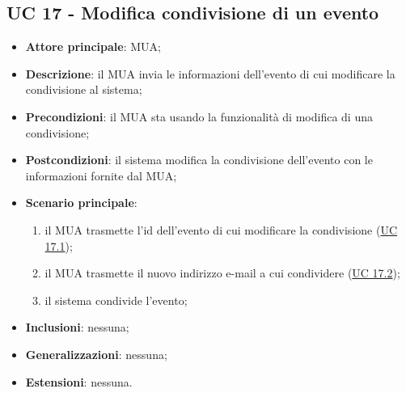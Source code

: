 \subsection{UC 17 - Modifica condivisione di un evento} \label{sec:UC17}

    \begin{itemize}
        \item \textbf{Attore principale}: MUA;
        \item \textbf{Descrizione}: il MUA invia le informazioni dell'evento di cui modificare la condivisione al sistema;
        \item \textbf{Precondizioni}: il MUA sta usando la funzionalità di modifica di una condivisione;
        \item \textbf{Postcondizioni}: il sistema modifica la condivisione dell'evento con le informazioni fornite dal MUA;
        \item \textbf{Scenario principale}:
            \begin{enumerate}
                \item il MUA trasmette l'id dell'evento di cui modificare la condivisione (\hyperref[sec:UC17.1]{UC 17.1});
                \item il MUA trasmette il nuovo indirizzo e-mail a cui condividere (\hyperref[sec:UC17.2]{UC 17.2});
                \item il sistema condivide l'evento;
            \end{enumerate}
        \item \textbf{Inclusioni}: nessuna;
        \item \textbf{Generalizzazioni}: nessuna;
        \item \textbf{Estensioni}: nessuna.
    \end{itemize}

